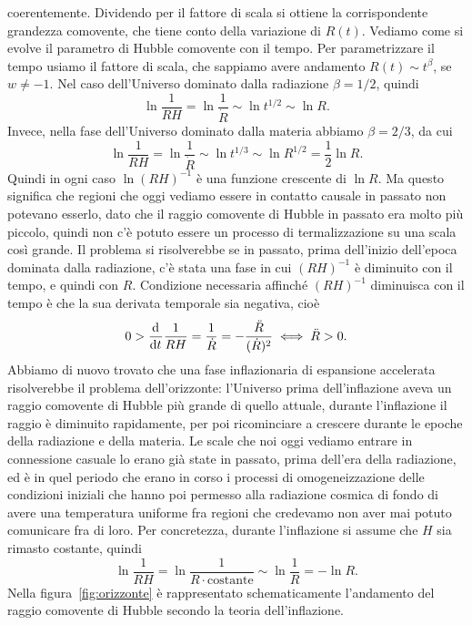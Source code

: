 coerentemente.  Dividendo per il fattore di scala si ottiene la corrispondente
grandezza comovente, che tiene conto della variazione di \(R(t)\).  Vediamo come
si evolve il parametro di Hubble comovente con il tempo.  Per parametrizzare il
tempo usiamo il fattore di scala, che sappiamo avere andamento \(R(t)\sim
t^{\beta}\), se \(w\neq -1\).  Nel caso dell'Universo dominato dalla radiazione
\(\beta = 1/2\), quindi
\begin{equation}
  \ln \frac{1}{RH} = \ln \frac{1}{\dot{R}} \sim \ln t^{1/2} \sim \ln R.
\end{equation}
Invece, nella fase dell'Universo dominato dalla materia abbiamo \(\beta = 2/3\),
da cui
\begin{equation}
  \ln \frac{1}{RH} = \ln \frac{1}{\dot{R}} \sim \ln t^{1/3} \sim \ln R^{1/2} =
  \frac{1}{2}\ln R.
\end{equation}
Quindi in ogni caso \(\ln (RH)^{-1}\) è una funzione crescente di \(\ln R\).  Ma
questo significa che regioni che oggi vediamo essere in contatto causale in
passato non potevano esserlo, dato che il raggio comovente di Hubble in passato
era molto più piccolo, quindi non c'è potuto essere un processo di
termalizzazione su una scala così grande.  Il problema si risolverebbe se in
passato, prima dell'inizio dell'epoca dominata dalla radiazione, c'è stata una
fase in cui \((RH)^{-1}\) è diminuito con il tempo, e quindi con \(R\).
Condizione necessaria affinché \((RH)^{-1}\) diminuisca con il tempo è che la
sua derivata temporale sia negativa, cioè
\begin{equation}
  0 > \frac{{\mathop{}\!\mathrm{d}^{}}}{\mathop{}\!\mathrm{d} {t}^{}} \frac{1}{RH} = \frac{1}{\dot{R}} =
  -\frac{\ddot{R}}{(\dot{R})^{2}} \iff \ddot{R}>0.
\end{equation}
Abbiamo di nuovo trovato che una fase inflazionaria di espansione accelerata
risolverebbe il problema dell'orizzonte: l'Universo prima dell'inflazione aveva
un raggio comovente di Hubble più grande di quello attuale, durante l'inflazione
il raggio è diminuito rapidamente, per poi ricominciare a crescere durante le
epoche della radiazione e della materia.  Le scale che noi oggi vediamo entrare
in connessione casuale lo erano già state in passato, prima dell'era della
radiazione, ed è in quel periodo che erano in corso i processi di
omogeneizzazione delle condizioni iniziali che hanno poi permesso alla
radiazione cosmica di fondo di avere una temperatura uniforme fra regioni che
credevamo non aver mai potuto comunicare fra di loro.  Per concretezza, durante
l'inflazione si assume che \(H\) sia rimasto costante, quindi
\begin{equation}
  \ln \frac{1}{RH} = \ln \frac{1}{R \cdot \text{costante}} \sim \ln \frac{1}{R}
  = - \ln R.
\end{equation}
Nella figura~\ref{fig:orizzonte} è rappresentato schematicamente l'andamento del
raggio comovente di Hubble secondo la teoria dell'inflazione.

